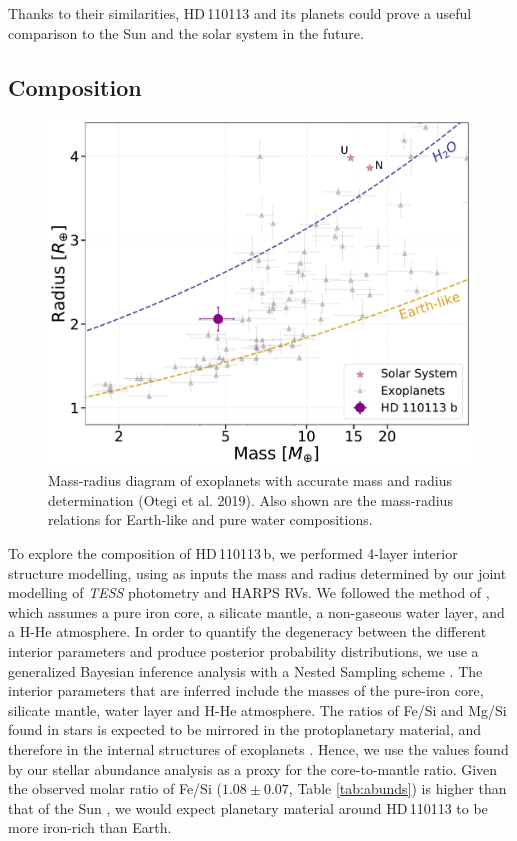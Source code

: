 \documentclass[fleqn,usenatbib]{mnras}
\newcommand{\tess}{{\it TESS}}
\newcommand{\harps}{{HARPS}}
\newcommand{\Tstar}{HD\,110113}
\newcommand{\Tplanet}{HD\,110113\,b}
\begin{document}
Thanks to their similarities, \Tstar{} and its planets could prove a useful comparison to the Sun and the solar system in the future.

\subsection{Composition}\label{sect:internal}

\begin{figure}
	\includegraphics[width=\columnwidth]{MR-755}
    \caption{Mass-radius diagram of exoplanets with accurate mass and radius determination (Otegi et al. 2019). Also shown are the mass-radius relations for Earth-like and pure water compositions.\label{fig:MR_Diagram}
    }
\end{figure}

To explore the composition of \Tplanet{}, we performed 4-layer interior structure modelling, using as inputs the mass and radius determined by our joint modelling of \tess{} photometry and \harps{} RVs.
We followed the method of \citet{otegi2020revisited}, which assumes a pure iron core, a silicate mantle, a non-gaseous water layer, and a H-He atmosphere.
In order to quantify the degeneracy between the different interior parameters and produce posterior probability distributions, we use a generalized Bayesian inference analysis with a Nested Sampling scheme \citep[e.g.][]{2014A&A...564A.125B}.
The interior parameters that are inferred include the masses of the pure-iron core, silicate mantle, water layer and H-He atmosphere.
The ratios of Fe/Si and Mg/Si found in stars is expected to be mirrored in the protoplanetary material, and therefore in the internal structures of exoplanets \citep{thiabaud2015elemental}.
Hence, we use the values found by our stellar abundance analysis as a proxy for the core-to-mantle ratio.
Given the observed molar ratio of Fe/Si ($1.08\pm0.07$, Table \ref{tab:abunds}) is higher than that of the Sun  \citep[0.86,][]{thiabaud2015elemental}, we would expect planetary material around \Tstar{} to be more iron-rich than Earth.
\end{document}
